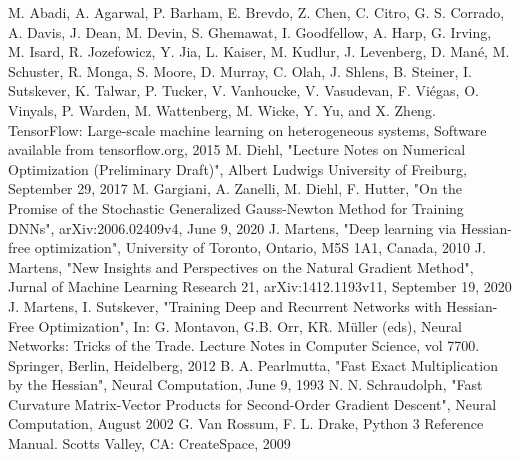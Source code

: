 \documentclass[conference]{IEEEtran}
\begin{document}
\begin{thebibliography}{00}
 M. Abadi, A. Agarwal, P. Barham, E. Brevdo,
Z. Chen, C. Citro, G. S. Corrado, A. Davis,
J. Dean, M. Devin, S. Ghemawat, I. Goodfellow,
A. Harp, G. Irving, M. Isard, R. Jozefowicz, Y. Jia,
L. Kaiser, M. Kudlur, J. Levenberg, D. Mané, M. Schuster,
R. Monga, S. Moore, D. Murray, C. Olah, J. Shlens,
B. Steiner, I. Sutskever, K. Talwar, P. Tucker,
V. Vanhoucke, V. Vasudevan, F. Viégas,
O. Vinyals, P. Warden, M. Wattenberg, M. Wicke,
Y. Yu, and X. Zheng.
TensorFlow: Large-scale machine learning on heterogeneous systems, Software available from tensorflow.org, 2015	
 M. Diehl, "Lecture Notes on Numerical Optimization (Preliminary Draft)", Albert Ludwigs University of Freiburg, September 29, 2017	
 M. Gargiani, A. Zanelli, M. Diehl, F. Hutter, "On the Promise of the Stochastic Generalized Gauss-Newton Method for Training DNNs",  arXiv:2006.02409v4, June 9, 2020 
 J. Martens, "Deep learning via Hessian-free optimization", University of Toronto, Ontario, M5S 1A1, Canada, 2010
 J. Martens, "New Insights and Perspectives on the Natural Gradient Method", Jurnal of Machine Learning Research 21, arXiv:1412.1193v11, September 19, 2020
 J. Martens, I. Sutskever, "Training Deep and Recurrent Networks with Hessian-Free Optimization", In: G. Montavon, G.B. Orr, KR. Müller (eds), Neural Networks: Tricks of the Trade. Lecture Notes in Computer Science, vol 7700. Springer, Berlin, Heidelberg, 2012
 B. A. Pearlmutta, "Fast Exact Multiplication by the Hessian", Neural Computation, June 9, 1993
 N. N. Schraudolph, "Fast Curvature Matrix-Vector Products for Second-Order
Gradient Descent", Neural Computation, August 2002
 G. Van Rossum, F. L. Drake, Python 3 Reference Manual. Scotts Valley, CA: CreateSpace, 2009
\end{thebibliography}
\end{document}
